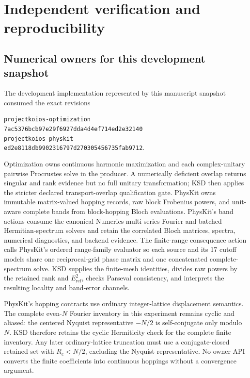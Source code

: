 \documentclass[11pt]{article}
\begin{document}
\section{Independent verification and reproducibility}

\subsection{Numerical owners for this development snapshot}

The development implementation represented by this manuscript snapshot consumed the
exact revisions
\begin{center}
\small
\texttt{projectkoios-optimization}\\
\texttt{7ac5376bcb97e29f6927dda4d4ef714ed2e32140}\\[2pt]
\texttt{projectkoios-physkit}\\
\texttt{ed2e8118db9902316797d270305456735fab9712}.
\end{center}
Optimization owns continuous harmonic maximization and each complex-unitary pairwise
Procrustes solve in the producer. A numerically deficient overlap returns singular and
rank evidence but no full unitary transformation; KSD then applies the stricter declared
transport-overlap qualification gate. PhysKit owns immutable matrix-valued hopping
records, raw block Frobenius powers, and unit-aware complete bands from block-hopping
Bloch evaluations. PhysKit's band actions consume the canonical Numerics multi-series Fourier and batched
Hermitian-spectrum solvers and retain the correlated Bloch matrices, spectra, numerical
diagnostics, and backend evidence. The finite-range consequence action calls PhysKit's
ordered range-family evaluator so each source and its 17 cutoff models share one
reciprocal-grid phase matrix and one concatenated complete-spectrum solve. KSD supplies the finite-mesh identities, divides raw
powers by the retained rank and $E_{\mathrm{ref}}^2$, checks Parseval consistency, and interprets the
resulting locality and band-error channels.

PhysKit's hopping contracts use ordinary integer-lattice displacement semantics. The
complete even-$N$ Fourier inventory in this experiment remains cyclic and aliased: the
centered Nyquist representative $-N/2$ is self-conjugate only modulo $N$. KSD therefore
retains the cyclic Hermiticity check for the complete finite inventory. Any later
ordinary-lattice truncation must use a conjugate-closed retained set with
$R_c<N/2$, excluding the Nyquist representative. No owner API converts the finite
coefficients into continuous hoppings without a convergence argument.
\end{document}
